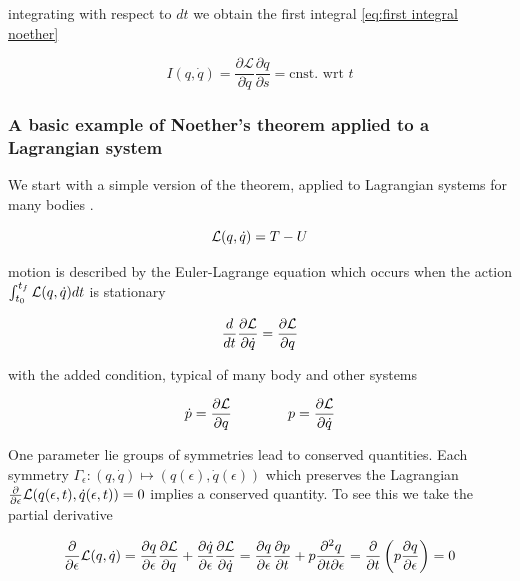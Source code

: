 \documentclass[12pt]{article}
\begin{document}
integrating with respect to $dt$ we obtain the first integral \eqref{eq:first integral noether}

\begin{equation}\label{eq:first integral noether}
    I(q,\dot q) = \frac{\partial \mathcal L}{\partial\dot q}\frac{\partial q}{\partial s} = \text{cnst. wrt } t
\end{equation}

\subsubsection{A basic example of Noether's theorem applied to a Lagrangian system}
We start with a simple version of the theorem, applied to Lagrangian systems for many bodies \cite{Morin}.

\begin{equation}\label{eq:lagrangian}
    \mathcal L(q,\dot q) = T - U
\end{equation}

motion is described by the Euler-Lagrange equation which occurs when the action $\int_{t_0}^{t_f} \mathcal L(q,\dot q) dt$ is stationary

\begin{equation}\label{eq:euler lagrange}
    \frac{d}{dt}\frac{\partial \mathcal L}{\partial \dot q} = \frac{\partial \mathcal L}{\partial q}
\end{equation}

with the added condition, typical of many body and other systems

\begin{equation}\label{eq:lagrangian added conditions}
    \dot p = \frac{\partial \mathcal L}{\partial q} \qquad\qquad p = \frac{\partial \mathcal L}{\partial \dot q}
\end{equation}

One parameter lie groups of symmetries lead to conserved quantities. Each symmetry $\Gamma_\epsilon : (q,\dot q)\mapsto (q(\epsilon),\dot q(\epsilon))$ which preserves the Lagrangian $\frac{\partial}{\partial\epsilon}\mathcal L(q(\epsilon,t),\dot q(\epsilon,t)) = 0$ implies a conserved quantity. To see this we take the partial derivative

\begin{equation}\label{eq:noether's theorem 1 derivation}
\frac{\partial }{\partial \epsilon} \mathcal L(q,\dot q) = \frac{\partial q}{\partial \epsilon} \frac{\partial \mathcal L}{\partial q} + \frac{\partial \dot q}{\partial \epsilon}\frac{\partial \mathcal L}{\partial \dot q} = \frac{\partial q}{\partial \epsilon}\frac{\partial p}{\partial t} + p \frac{\partial^2 q}{\partial t \partial \epsilon} = \frac{\partial }{\partial t}\left( p \frac{\partial q}{\partial \epsilon} \right) = 0
\end{equation}
\end{document}
